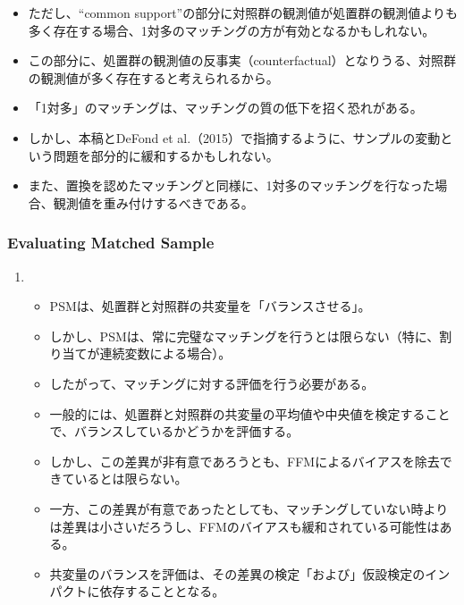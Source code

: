\begin{enumerate}
\begin{itemize}
    \item ただし、“common support”の部分に対照群の観測値が処置群の観測値よりも多く存在する場合、1対多のマッチングの方が有効となるかもしれない。
    \item この部分に、処置群の観測値の反事実（counterfactual）となりうる、対照群の観測値が多く存在すると考えられるから。
    \item 「1対多」のマッチングは、マッチングの質の低下を招く恐れがある。
    \item しかし、本稿とDeFond et al.（2015）で指摘するように、サンプルの変動という問題を部分的に緩和するかもしれない。
    \item また、置換を認めたマッチングと同様に、1対多のマッチングを行なった場合、観測値を重み付けするべきである。
   \end{itemize}
\end{enumerate}

\subsubsection*{Evaluating Matched Sample}
\begin{enumerate}
 \item 
   \begin{itemize}
    \item PSMは、処置群と対照群の共変量を「バランスさせる」。
    \item しかし、PSMは、常に完璧なマッチングを行うとは限らない（特に、割り当てが連続変数による場合）。
    \item したがって、マッチングに対する評価を行う必要がある。
    \item 一般的には、処置群と対照群の共変量の平均値や中央値を検定することで、バランスしているかどうかを評価する。
    \item しかし、この差異が非有意であろうとも、FFMによるバイアスを除去できているとは限らない。
    \item 一方、この差異が有意であったとしても、マッチングしていない時よりは差異は小さいだろうし、FFMのバイアスも緩和されている可能性はある。
    \item 共変量のバランスを評価は、その差異の検定「および」仮設検定のインパクトに依存することとなる。
   \end{itemize}
\end{enumerate}
 
